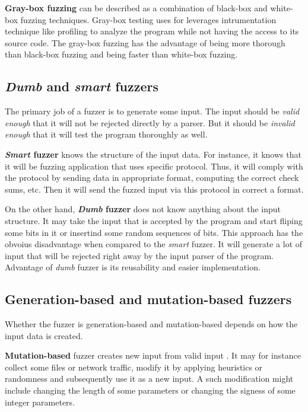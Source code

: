 \textbf{Gray-box fuzzing} can be described as a combination of black-box and white-box fuzzing techniques. Gray-box testing uses for leverages intrumentation technique like profiling to analyze the program while not having the access to its source code. The gray-box fuzzing has the advantage of being more thorough than black-box fuzzing and being faster than white-box fuzzing.


\subsection{\emph{Dumb} and \emph{smart} fuzzers}
\label{ssub:Dumb and smart fuzzers}
The primary job of a fuzzer is to generate some input. The input should be \emph{valid enough} that it will not be rejected directly by a parser. But it should be \emph{invalid enough} that it will test the program thoroughly as well.

\textbf{\emph{Smart} fuzzer} knows the structure of the input data. For instance, it knows that it will be fuzzing application that uses specific protocol. Thus, it will comply with the protocol by sending data in appropriate format, computing the correct check sums, etc. Then it will send the fuzzed input via this protocol in correct a format.

On the other hand, \textbf{\emph{Dumb} fuzzer} does not know anything about the input structure. It may take the input that is accepted by the program and start fliping some bits in it or insertind some random sequences of bits. This approach has the obvoius disadvantage when compared to the \emph{smart} fuzzer. It will generate a lot of input that will be rejected right away by the input parser of the program. Advantage of \emph{dumb} fuzzer is its reusability and easier implementation.

\subsection{Generation-based and mutation-based fuzzers}
\label{ssub:Generation-based and mutation-based fuzzers}
Whether the fuzzer is generation-based and mutation-based depends on how the input data is created.

\textbf{Mutation-based} fuzzer creates new input from valid input \cite{miller2007analysis}. It may for instance collect some files or network traffic, modify it by applying heuristics or randomness and subsequently use it as a new input. A such modification might include changing the length of some parameters or changing the signess of some integer parameters.

